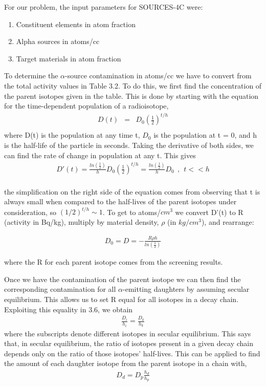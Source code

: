 \documentclass{report}
\begin{document}
For our problem, the input parameters for SOURCES-4C were:
\begin{enumerate}
\item Constituent elements in atom fraction
\item Alpha sources in atoms/cc
\item Target materials in atom fraction
\end{enumerate}

To determine the $\alpha$-source contamination in atoms/cc we have to convert
from the total activity values in Table 3.2. To do this, we first find the concentration of the parent isotopes given in the table. This is done by starting with the equation for the time-dependent population of a radioisotope,
\begin{eqnarray}
D(t) & =& D_0\left(\frac{1}{2}\right)^{t/h} \\
\end{eqnarray}
where D(t) is the population at any time t, $D_0$ is the population at t = 0, and h is the half-life of the particle in seconds. Taking the derivative of both sides, we can find the rate of change in population at any t. This gives
\begin{eqnarray}
D'(t) = \frac{ln\left(\frac{1}{2}\right)}{h}D_0\left(\frac{1}{2}\right)^{t/h} = \frac{ln\left(\frac{1}{2}\right)}{h}D_0 \ \ , \ \ t << h \\
\end{eqnarray}

the simplification on the right side of the equation comes from observing that t is always small when compared to the half-lives of the parent isotopes under consideration, so $(1/2)^{t/h} \sim 1$. To get to atoms/$cm^3$ we convert D'(t) to R (activity in Bq/kg), multiply by material density, $\rho$ (in $kg/cm^3$), and rearrange:

\begin{eqnarray}
D_0 = D = -\frac{R \rho h}{ln\left(\frac{1}{2}\right)}
\end{eqnarray}

where the R for each parent isotope comes from the screening results.

Once we have the contamination of the parent isotope we can then find the
corresponding contamination for all $\alpha$-emitting daughters by assuming secular equilibrium. This allows us to set R equal for all isotopes in a decay chain. Exploiting this equality in 3.6, we obtain
\begin{eqnarray}
\frac{D_i}{h_i} = \frac{D_k}{h_k}
\end{eqnarray}
where the subscripts denote different isotopes in secular equilibrium. This says that, in secular equilibrium, the ratio of isotopes present in a given decay chain depends only on the ratio of those isotopes' half-lives. This can be applied to find the amount of each daughter isotope from the parent isotope in a chain with,
\begin{eqnarray}
D_{d} = D_{p}\frac{h_{d}}{h_{p}}
\end{eqnarray}
\end{document}
